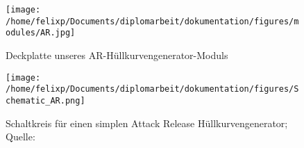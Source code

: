 \begin{figure}[hp]
\centering
\texttt{[image: /home/felixp/Documents/diplomarbeit/dokumentation/figures/modules/AR.jpg]}
\caption{Deckplatte unseres AR-Hüllkurvengenerator-Moduls}
\end{figure}

\begin{figure}[hp]
\centering
\texttt{[image: /home/felixp/Documents/diplomarbeit/dokumentation/figures/Schematic\_AR.png]}
\caption{Schaltkreis für einen simplen Attack Release Hüllkurvengenerator; Quelle: \cite{synthnerd:ar}}
\end{figure}
